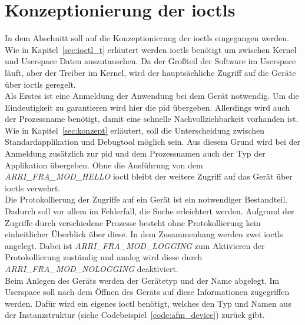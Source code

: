 
\section{Konzeptionierung der \acl{ioctl}s}\label{sec:ioctl}
In dem Abschnitt soll auf die Konzeptionierung der \ac{ioctl}s eingegangen werden. Wie in Kapitel~\ref{sec:ioctl_t} erläutert werden \ac{ioctl}s benötigt um zwischen Kernel und Userspace Daten auszutauschen. Da der Großteil der Software im Userspace läuft, aber der Treiber im Kernel, wird der hauptsächliche Zugriff auf die Geräte über \ac{ioctl}s geregelt.\\


Als Erstes ist eine Anmeldung der Anwendung bei dem Gerät notwendig. Um die Eindeutigkeit zu garantieren wird hier die \ac{pid} übergeben. Allerdings wird auch der Prozessname benötigt, damit eine schnelle Nachvollziehbarkeit vorhanden ist. Wie in Kapitel~\ref{sec:konzept} erläutert, soll die Unterscheidung zwischen Standardapplikation und Debugtool möglich sein. Aus diesem Grund wird bei der Anmeldung zusätzlich zur \ac{pid} und dem Prozessnamen auch der Typ der Applikation übergeben. 
Ohne die Ausführung von dem \textit{ARRI\_FRA\_MOD\_HELLO} \ac{ioctl} bleibt der weitere Zugriff auf das Gerät über \ac{ioctl}s verwehrt.\\

Die Protokollierung der Zugriffe auf ein Gerät ist ein notwendiger Bestandteil. Dadurch soll vor allem im Fehlerfall, die Suche erleichtert werden. Aufgrund der Zugriffe durch verschiedene Prozesse besteht ohne Protokollierung kein einheitlicher Überblick über diese.
In dem Zusammenhang werden zwei \ac{ioctl}s angelegt. Dabei ist \textit{ARRI\_FRA\_MOD\_LOGGING} zum Aktivieren der Protokollierung zuständig und analog wird diese durch \textit{ARRI\_FRA\_MOD\_NOLOGGING} deaktiviert. \\

Beim Anlegen des Geräts werden der Gerätetyp und der Name abgelegt. Im Userspace soll nach dem Öffnen des Geräts auf diese Informationen zugegriffen werden. Dafür wird ein eigenes \ac{ioctl} benötigt, welches den Typ und Namen aus der Instanzstruktur (siehe Codebeispiel~\ref{code:afm_device}) zurück gibt.\\

